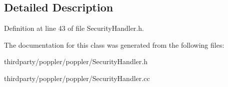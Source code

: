 \subsection{Detailed Description}


Definition at line 43 of file Security\+Handler.\+h.



The documentation for this class was generated from the following files\+:\begin{DoxyCompactItemize}
\item 
thirdparty/poppler/poppler/Security\+Handler.\+h\item 
thirdparty/poppler/poppler/Security\+Handler.\+cc\end{DoxyCompactItemize}
